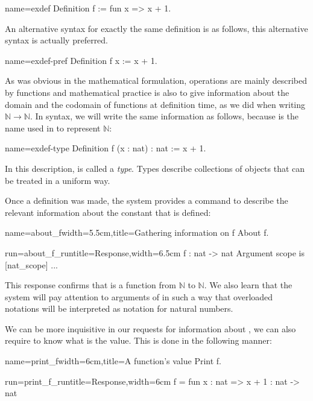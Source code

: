 \begin{coq}{name=exdef}{}
Definition f := fun x => x + 1.
\end{coq}
An alternative syntax for exactly the same definition is as follows,
this alternative syntax is actually preferred.

\begin{coq}{name=exdef-pref}{}
Definition f x := x + 1.
\end{coq}
As was obvious in the mathematical formulation, operations are mainly
described by functions and mathematical practice is also to give
information about the domain and the codomain of functions at
definition time, as we did when writing
\({\mathbb{N}}\rightarrow{\mathbb{N}}\).  In \Coq{} syntax, we will write
the same information as follows, because  is the name used in
\Coq{} to represent \(\mathbb{N}\):

\begin{coq}{name=exdef-type}{}
Definition f (x : nat) : nat := x + 1.
\end{coq}
In this description,  is called a {\em type}.  Types describe
collections of objects that can be treated in a uniform way.

Once a definition was made, the \Coq{} system provides a command to
describe the relevant information about the constant that is defined:

\begin{coq}{name=about_f}{width=5.5cm,title=Gathering information on f}
About f.
$~$
\end{coq}
\begin{coqout}{run=about_f_run}{title=Response,width=6.5cm}
f : nat -> nat
Argument scope is [nat_scope] ...
\end{coqout}
This response confirms that  is a function from
\({\mathbb{N}}\) to \({\mathbb{N}}\).
We also learn that the \Coq{} system will pay attention to
arguments of  in such a way that overloaded notations
will be interpreted as notation for natural numbers.

We can be more inquisitive in our requests for information about
, we can also require to know what is the value.  This is done in
the following manner:

\begin{coq}{name=print_f}{width=6cm,title=A function's value}
Print f.
$~$
\end{coq}
\begin{coqout}{run=print_f_run}{title=Response,width=6cm}
f = fun x : nat => x + 1
  : nat -> nat
\end{coqout}

